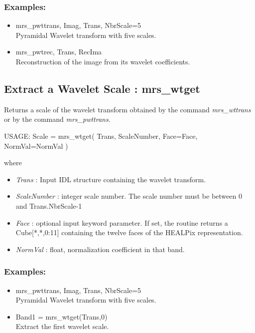 \subsubsection*{Examples:} 
\begin{itemize}
\item mrs\_pwttrans, Imag, Trans, NbrScale=5 \\
Pyramidal Wavelet transform with five scales.
\item  mrs\_pwtrec, Trans, RecIma  \\
Reconstruction of the image from its wavelet coefficients.
\end{itemize}



\subsection{Extract a Wavelet Scale : mrs\_wtget}
Returns a scale of the wavelet transform obtained by the command {\em mrs\_wttrans} or by the command {\em mrs\_pwttrans}.
 {\bf
\begin{center}
     USAGE:   Scale = mrs\_wtget( Trans, ScaleNumber, Face=Face, NormVal=NormVal )
\end{center}}
where 
\begin{itemize}
\item {\em Trans} : Input IDL structure containing the wavelet transform.  
\item {\em ScaleNumber} : integer scale number. The scale number must be between 0 and Trans.NbrScale-1
\item {\em Face} : optional input keyword parameter. If set, the routine returns a Cube[*,*,0:11] containing the twelve faces of the HEALPix representation.
\item {\em NormVal} : float, normalization coefficient in that band. 
\end{itemize}

\subsubsection*{Examples:} 
\begin{itemize}
\item mrs\_pwttrans, Imag, Trans, NbrScale=5 \\
Pyramidal Wavelet transform with five scales.
\item  Band1 = mrs\_wtget(Trans,0) \\
Extract the first wavelet scale.
\end{itemize}



